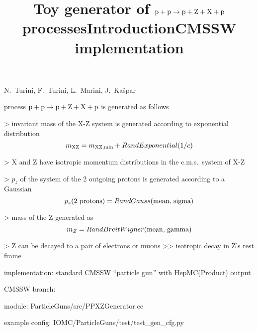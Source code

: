 


\newpage %

\def\author{PPS}
\def\caption{PPXZ generator}
\def\date{17 Oct 2018}

\newpage %
\hbox{}
\vfil
\title{Toy generator of $\rm p + p \rightarrow p + Z + X + p$ processes}
\vskip3mm
\centerline{N.~Turini, F.~Turini, L.~Marini, J.~Ka\v spar}
\vfil

\newpage %
\title{Introduction}

\> process $\rm p + p \rightarrow p + Z + X + p$ is generated as follows

\>> invariant mass of the X-Z system is generated according to exponential distribution
\vskip-3mm
\cThird
$$m_{\rm XZ} = m_{\rm XZ,min} + RandExponential(1/c)$$
\vskip2mm

\>> X and Z have isotropic momentum distributions in the c.m.s.~system of X-Z

\>> $p_z$ of the system of the 2 outgoing protons is generated according to a Gaussian
\cThird
\vskip-2mm
$$p_z(\hbox{2 protons}) = RandGauss(\hbox{mean, sigma})$$
\vskip2mm

\>> mass of the Z generated as
\cThird
\vskip-2mm
$$m_Z = RandBreitWigner(\hbox{mean, gamma})$$
\vskip2mm

\>> Z can be decayed to a pair of electrons or muons
\>>> isotropic decay in Z's rest frame



\newpage %
\title{CMSSW implementation}

\> implementation: standard CMSSW ``particle gun'' with HepMC(Product) output

\> CMSSW branch:\\ 

\NormalFonts

\> module: ParticleGuns/src/PPXZGenerator.cc

\> example config: IOMC/ParticleGuns/test/test\_gen\_cfg.py

